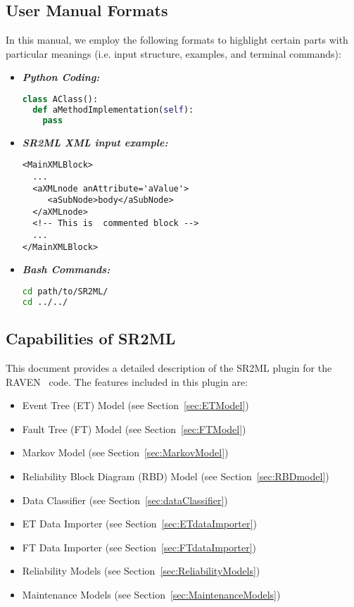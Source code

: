 \subsection{User Manual Formats}
In this manual, we employ the following formats to highlight certain parts with
particular meanings (i.e. input structure, examples, and terminal commands):

\begin{itemize}
\item \textbf{\textit{Python Coding:}}
\begin{lstlisting}[language=python]
class AClass():
  def aMethodImplementation(self):
    pass
\end{lstlisting}
\item \textbf{\textit{SR2ML XML input example:}}
\begin{lstlisting}[style=XML,morekeywords={anAttribute}]
<MainXMLBlock>
  ...
  <aXMLnode anAttribute='aValue'>
     <aSubNode>body</aSubNode>
  </aXMLnode>
  <!-- This is  commented block -->
  ...
</MainXMLBlock>
\end{lstlisting}
\item \textbf{\textit{Bash Commands:}}
\begin{lstlisting}[language=bash]
cd path/to/SR2ML/
cd ../../
\end{lstlisting}
\end{itemize}

\subsection{Capabilities of SR2ML}
This document provides a detailed description of the SR2ML plugin for the RAVEN~\cite{RAVEN,RAVENtheoryMan} code.
The features included in this plugin are:
\begin{itemize}
	\item Event Tree (ET) Model (see Section~\ref{sec:ETModel})
	\item Fault Tree (FT) Model (see Section~\ref{sec:FTModel})
	\item Markov Model (see Section~\ref{sec:MarkovModel})
	\item Reliability Block Diagram (RBD) Model (see Section~\ref{sec:RBDmodel})
	\item Data Classifier (see Section~\ref{sec:dataClassifier})
	\item ET Data Importer (see Section~\ref{sec:ETdataImporter})
	\item FT Data Importer (see Section~\ref{sec:FTdataImporter})
	\item Reliability Models (see Section~\ref{sec:ReliabilityModels})
  \item Maintenance Models (see Section~\ref{sec:MaintenanceModels})
\end{itemize}
